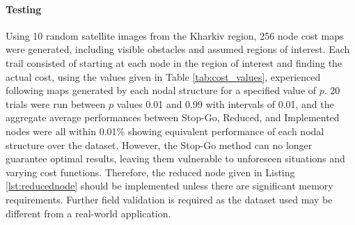 \paragraph{Testing}
Using 10 random satellite images from the Kharkiv region, 256 node cost maps were generated, including visible obstacles and assumed regions of interest. Each trail consisted of starting at each node in the region of interest and finding the actual cost, using the values given in Table \ref{tab:cost_values}, experienced following maps generated by each nodal structure for a specified value of $p$. 20 trials were run between $p$ values 0.01 and 0.99 with intervals of 0.01, and the aggregate average performances between Stop-Go, Reduced, and Implemented nodes were all within 0.01\% showing equivalent performance of each nodal structure over the dataset. However, the Stop-Go method can no longer guarantee optimal results, leaving them vulnerable to unforeseen situations and varying cost functions. Therefore, the reduced node given in Listing \ref{lst:reducednode} should be implemented unless there are significant memory requirements. Further field validation is required as the dataset used may be different from a real-world application.



\begin{comment}
\paragraph{Exhaustive Search}
The simplest algorithm is the recursive function shown in Algorithm \ref{alg: search}. There are steps taken to increase the efficiency, including pruning lines that already exceed the minimum cost as the cost is monotonic increasing, and automatically terminating lines when they can land safely. However, the worst-case time complexity remains $O(|V|6^{depth})$ as each node has 6 neighbours that get called recursively. To get guaranteed correct results, it would require searching all paths as long as $|V|$, as costs cannot fall below 0, so it is never advantageous to revisit a node. Therefore, the worst-case complexity for guaranteed optimal paths is $O(|V|6^{|V|})$. This is not usable for practical applications, therefore, it requires a compromise on the depth of search, no longer getting optimal path results.
\end{comment}